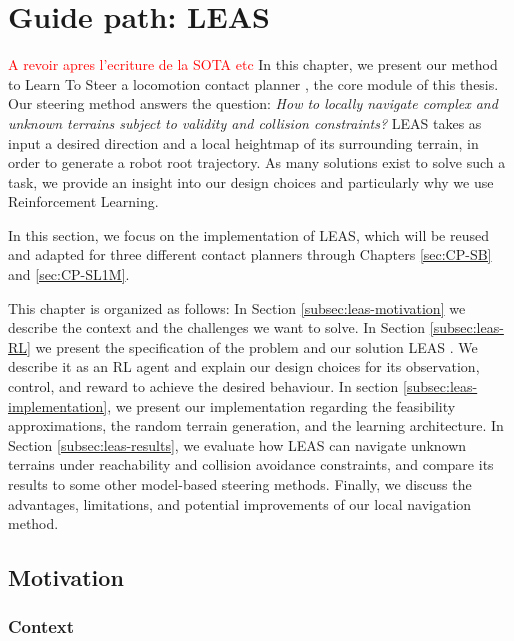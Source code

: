

\chapter{Guide path: LEAS}
\label{sec:LEAS}
\minitoc
\bigskip

\textcolor{red}{A revoir apres l'ecriture de la SOTA etc}
In this chapter, we present our method to Learn To Steer a locomotion contact planner , the core module of this thesis. 
Our steering method answers the question: \textit{How to locally navigate complex and unknown terrains subject to validity and collision constraints?}
LEAS takes as input a desired direction and a local heightmap of its surrounding terrain, in order to generate a robot root trajectory.
As many solutions exist to solve such a task, we provide an insight into our design choices and particularly why we use Reinforcement Learning.

In this section, we focus on the implementation of LEAS, which will be reused and adapted for three different contact planners through Chapters \ref{sec:CP-SB} and \ref{sec:CP-SL1M}.

This chapter is organized as follows: 
In Section \ref{subsec:leas-motivation} we describe the context and the challenges we want to solve. In Section \ref{subsec:leas-RL} we present the specification of the problem and our solution LEAS \cite{LEAS}. We describe it as an RL agent and explain our design choices for its observation, control, and reward to achieve the desired behaviour.
In section \ref{subsec:leas-implementation}, we present our implementation regarding the feasibility approximations, the random terrain generation, and the learning architecture.
In Section \ref{subsec:leas-results}, we evaluate how LEAS can navigate unknown terrains under reachability and collision avoidance constraints, and compare its results to some other model-based steering methods.
Finally, we discuss the advantages, limitations, and potential improvements of our local navigation method.

\section{Motivation\label{subsec:leas-motivation}}
\subsection{Context\label{subsubsec:context}}

